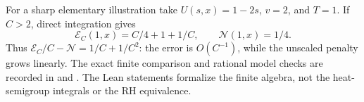 For a sharp elementary illustration
take $U(s,x)=1-2s$, $v=2$,
and $T=1$. If $C>2$, direct
integration gives
\[
\mathcal E_C(1,x)=C/4+1+1/C,
\qquad
\mathcal N(1,x)=1/4.
\]
Thus
$\mathcal E_C/C-\mathcal N=1/C+1/C^2$:
the error is $O(C^{-1})$, while the
unscaled penalty grows linearly.
The exact finite comparison and
rational model checks are recorded in
and
.
The Lean statements formalize the
finite algebra, not the heat-semigroup
integrals or the RH equivalence.
